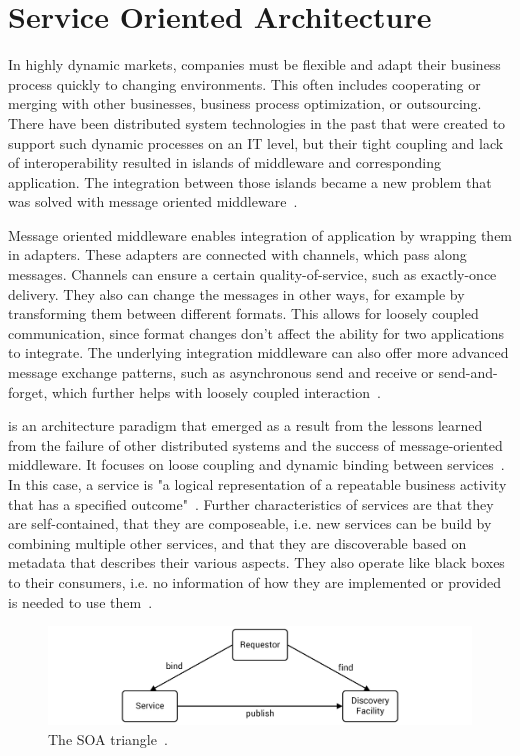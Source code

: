 \section{Service Oriented Architecture}
\label{fundamentals:service}

In highly dynamic markets, companies must be flexible and adapt their business process quickly to changing environments.
This often includes cooperating or merging with other businesses, business process optimization, or outsourcing.
There have been distributed system technologies in the past that were created to support such dynamic processes on an IT level, but their tight coupling and lack of interoperability resulted in islands of middleware and corresponding application.
The integration between those islands became a new problem that was solved with message oriented middleware~\autocite{webservices}.

Message oriented middleware enables integration of application by wrapping them in adapters.
These adapters are connected with channels, which pass along messages.
Channels can ensure a certain quality-of-service, such as exactly-once delivery.
They also can change the messages in other ways, for example by transforming them between different formats.
This allows for loosely coupled communication, since format changes don't affect the ability for two applications to integrate.
The underlying integration middleware can also offer more advanced message exchange patterns, such as asynchronous send and receive or send-and-forget, which further helps with loosely coupled interaction~\autocite{webservices}.

 is an architecture paradigm that emerged as a result from the lessons learned from the failure of other distributed systems and the success of message-oriented middleware.
It focuses on loose coupling and dynamic binding between services~\autocite{webservices}.
In this case, a service is "a logical representation of a repeatable business activity that has a specified outcome"~\autocite{soa}.
Further characteristics of services are that they are self-contained, that they are composeable, i.e. new services can be build by combining multiple other services, and that they are discoverable based on metadata that describes their various aspects.
They also operate like black boxes to their consumers, i.e. no information of how they are implemented or provided is needed to use them~\autocite{webservices}.

\begin{figure}[!htbp]
	\centering
	\includegraphics[resolution=600]{fundamentals/assets/triangle}
	\caption{The SOA triangle~\autocite[based on][]{webservices}.}
	\label{image:triangle}
\end{figure}

